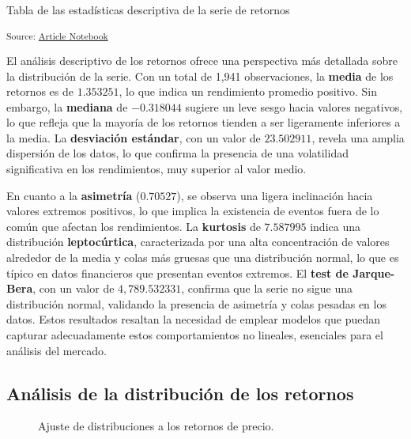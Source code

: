 \documentclass[
  number,
  preprint,
  3p,
  onecolumn]{elsarticle}
\begin{document}
Tabla de las estadísticas descriptiva de la serie de retornos

\textsubscript{Source:
\href{https://iancont.github.io/fixed_income_garch/index-preview.html}{Article
Notebook}}

El análisis descriptivo de los retornos ofrece una perspectiva más
detallada sobre la distribución de la serie. Con un total de 1,941
observaciones, la \textbf{media} de los retornos es de \(1.353251\), lo
que indica un rendimiento promedio positivo. Sin embargo, la
\textbf{mediana} de \(-0.318044\) sugiere un leve sesgo hacia valores
negativos, lo que refleja que la mayoría de los retornos tienden a ser
ligeramente inferiores a la media. La \textbf{desviación estándar}, con
un valor de \(23.502911\), revela una amplia dispersión de los datos, lo
que confirma la presencia de una volatilidad significativa en los
rendimientos, muy superior al valor medio.

En cuanto a la \textbf{asimetría} (\(0.70527\)), se observa una ligera
inclinación hacia valores extremos positivos, lo que implica la
existencia de eventos fuera de lo común que afectan los rendimientos. La
\textbf{kurtosis} de \(7.587995\) indica una distribución
\textbf{leptocúrtica}, caracterizada por una alta concentración de
valores alrededor de la media y colas más gruesas que una distribución
normal, lo que es típico en datos financieros que presentan eventos
extremos. El \textbf{test de Jarque-Bera}, con un valor de
\(4,789.532331\), confirma que la serie no sigue una distribución
normal, validando la presencia de asimetría y colas pesadas en los
datos. Estos resultados resaltan la necesidad de emplear modelos que
puedan capturar adecuadamente estos comportamientos no lineales,
esenciales para el análisis del mercado.

\subsection{Análisis de la distribución de los
retornos}\label{sec-distribucion-retornos}

\begin{figure}[H]


\caption{\label{fig-distribution-fitting}Ajuste de distribuciones a los
retornos de precio.}

\end{figure}%
\end{document}
